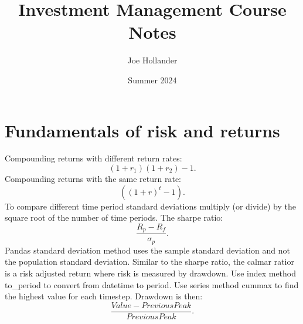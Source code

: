 \documentclass{article}
\title{Investment Management Course Notes}
\author{Joe Hollander}
\date{Summer 2024}
\begin{document}
\maketitle

\section[1.1]{Fundamentals of risk and returns}

Compounding returns with different return rates:
\[
(1 + r_1)(1 + r_2) - 1.
\]
Compounding returns with the same return rate:
\[
((1 + r)^t - 1). 
\]
To compare different time period standard deviations multiply (or divide)
by the square root of the number of time periods.
The sharpe ratio:
\[
\frac{R_p-R_f}{\sigma_p}.
\]
Pandas standard deviation method uses the sample
standard deviation and not the population standard
deviation. Similar to the sharpe ratio, the calmar
ratior is a risk adjusted return where risk is measured
by drawdown. Use index method to\_period to convert from
datetime to period. Use series method cummax to find the
highest value for each timestep. Drawdown is then: 
\[
\frac{Value - Previous Peak}{Previous Peak}.
\]


 
\end{document}
